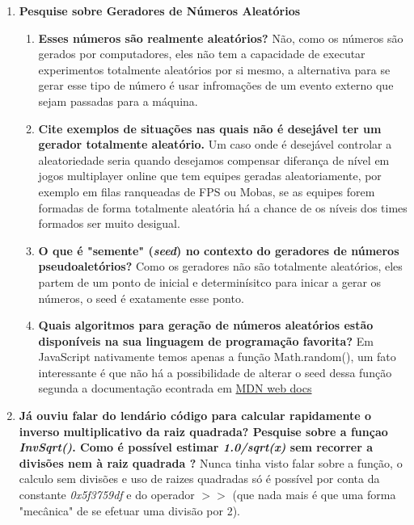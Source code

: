 \documentclass{abntex2}
\begin{document}
\begin{enumerate}
\begin{enumerate}
    \end{enumerate}
    \item \textbf{Pesquise sobre Geradores de Números Aleatórios}
    \begin{enumerate}
      \item \textbf{Esses números são realmente aleatórios?} \newline
      Não, como os números são gerados por computadores, eles não tem a capacidade de executar experimentos totalmente aleatórios por si mesmo, a alternativa para se gerar esse tipo de número é usar infromações de um evento externo que sejam passadas para a máquina.
      \item \textbf{Cite exemplos de situações nas quais não é desejável ter um gerador totalmente aleatório.} \newline
      Um caso onde é desejável controlar a aleatoriedade seria quando desejamos compensar diferança de nível em jogos multiplayer online que tem equipes geradas aleatoriamente, por exemplo em filas ranqueadas de FPS ou Mobas, se as equipes forem formadas de forma totalmente aleatória há a chance de os níveis dos times formados ser muito desigual.
      \item \textbf{O que é "semente" (\textit{seed}) no contexto do geradores de números pseudoaletórios?} \newline
      Como os geradores não são totalmente aleatórios, eles partem de um ponto de inicial e determinísitco para inicar a gerar os números, o seed é exatamente esse ponto.
      \item \textbf{Quais algoritmos para geração de números aleatórios estão disponíveis na sua linguagem de programação favorita?} \newline
      Em JavaScript nativamente temos apenas a função Math.random(), um fato interessante é que não há a possibilidade de alterar o seed dessa função segunda a documentação econtrada em
      \href{https://developer.mozilla.org/en-US/docs/Web/JavaScript/Reference/Global_Objects/Math/random}{MDN web docs}
    \end{enumerate}
    \item \textbf{Já ouviu falar do lendário código para calcular rapidamente o inverso multiplicativo da raiz quadrada? Pesquise sobre a funçao \textit{InvSqrt()}. Como é possível estimar \textit{1.0/sqrt(x)} sem recorrer a divisões nem à raiz quadrada ?} \newline
    Nunca tinha visto falar sobre a função, o calculo sem divisões e uso de raizes quadradas só é possível por conta da constante \textit{0x5f3759df} e do operador $>>$ (que nada mais é que uma forma "mecânica" de se efetuar uma divisão por 2).

\end{enumerate}
\end{document}
